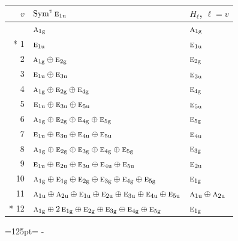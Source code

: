 \documentclass[10pt,a4paper]{article}
\newcommand{\needspace}[1]{\par\penalty-100\begingroup\dimen0=#1\relax\dimen2=\pagegoal
  \advance\dimen2-\pagetotal\ifdim\dimen0>\dimen2\relax\ifdim\dimen2>0pt\vfil\break\fi\fi
  \endgroup}
\numberwithin{equation}{section}
\newcommand{\irr}[1]{\text{\normalfont\scshape #1}}
\newcommand{\ptag}[1]{\mathrm{#1}}
\begin{document}
{\small\begin{longtable}{@{}rll@{}}\toprule
$v$ & $\operatorname{Sym}^{v}\irr{e}_{1\ptag{u}}$ & $H_\ell$, $\ell = v$\\\midrule\endhead
\bottomrule\endfoot\endlastfoot
0 & $\irr{a}_{1\ptag{g}}$ & $\irr{a}_{1\ptag{g}}$\\*
1 & $\irr{e}_{1\ptag{u}}$ & $\irr{e}_{1\ptag{u}}$\\
2 & $\irr{a}_{1\ptag{g}} \oplus \irr{e}_{2\ptag{g}}$ & $\irr{e}_{2\ptag{g}}$\\
3 & $\irr{e}_{1\ptag{u}} \oplus \irr{e}_{3\ptag{u}}$ & $\irr{e}_{3\ptag{u}}$\\
4 & $\irr{a}_{1\ptag{g}} \oplus \irr{e}_{2\ptag{g}} \oplus \irr{e}_{4\ptag{g}}$ & $\irr{e}_{4\ptag{g}}$\\
5 & $\irr{e}_{1\ptag{u}} \oplus \irr{e}_{3\ptag{u}} \oplus \irr{e}_{5\ptag{u}}$ & $\irr{e}_{5\ptag{u}}$\\
6 & $\irr{a}_{1\ptag{g}} \oplus \irr{e}_{2\ptag{g}} \oplus \irr{e}_{4\ptag{g}} \oplus \irr{e}_{5\ptag{g}}$ & $\irr{e}_{5\ptag{g}}$\\
7 & $\irr{e}_{1\ptag{u}} \oplus \irr{e}_{3\ptag{u}} \oplus \irr{e}_{4\ptag{u}} \oplus \irr{e}_{5\ptag{u}}$ & $\irr{e}_{4\ptag{u}}$\\
8 & $\irr{a}_{1\ptag{g}} \oplus \irr{e}_{2\ptag{g}} \oplus \irr{e}_{3\ptag{g}} \oplus \irr{e}_{4\ptag{g}} \oplus \irr{e}_{5\ptag{g}}$ & $\irr{e}_{3\ptag{g}}$\\
9 & $\irr{e}_{1\ptag{u}} \oplus \irr{e}_{2\ptag{u}} \oplus \irr{e}_{3\ptag{u}} \oplus \irr{e}_{4\ptag{u}} \oplus \irr{e}_{5\ptag{u}}$ & $\irr{e}_{2\ptag{u}}$\\
10 & $\irr{a}_{1\ptag{g}} \oplus \irr{e}_{1\ptag{g}} \oplus \irr{e}_{2\ptag{g}} \oplus \irr{e}_{3\ptag{g}} \oplus \irr{e}_{4\ptag{g}} \oplus \irr{e}_{5\ptag{g}}$ & $\irr{e}_{1\ptag{g}}$\\
11 & $\irr{a}_{1\ptag{u}} \oplus \irr{a}_{2\ptag{u}} \oplus \irr{e}_{1\ptag{u}} \oplus \irr{e}_{2\ptag{u}} \oplus \irr{e}_{3\ptag{u}} \oplus \irr{e}_{4\ptag{u}} \oplus \irr{e}_{5\ptag{u}}$ & $\irr{a}_{1\ptag{u}} \oplus \irr{a}_{2\ptag{u}}$\\*
12 & $\irr{a}_{1\ptag{g}} \oplus 2\,\irr{e}_{1\ptag{g}} \oplus \irr{e}_{2\ptag{g}} \oplus \irr{e}_{3\ptag{g}} \oplus \irr{e}_{4\ptag{g}} \oplus \irr{e}_{5\ptag{g}}$ & $\irr{e}_{1\ptag{g}}$\\
\bottomrule\end{longtable}}
\needspace{125pt}
\end{document}
